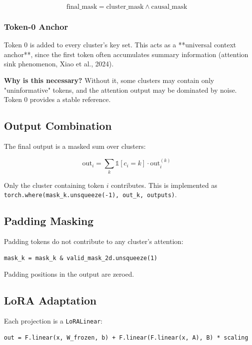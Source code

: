 \[
\text{final\_mask} = \text{cluster\_mask} \wedge \text{causal\_mask}
\tag{4.5}
\]

\subsubsection{Token-0 Anchor}

Token 0 is added to every cluster's key set. This acts as a **universal 
context anchor**, since the first token often accumulates summary 
information (attention sink phenomenon, Xiao et al., 2024).

\textbf{Why is this necessary?} Without it, some clusters may contain only 
"uninformative" tokens, and the attention output may be dominated by 
noise. Token 0 provides a stable reference.

\subsection{Output Combination}

The final output is a masked sum over clusters:

\[
\text{out}_i = \sum_k \mathbb{1}[c_i = k] \cdot \text{out}_i^{(k)}
\tag{4.6}
\]

Only the cluster containing token $i$ contributes. This is implemented as 
\texttt{torch.where(mask\_k.unsqueeze(-1), out\_k, outputs)}.

\subsection{Padding Masking}

Padding tokens do not contribute to any cluster's attention:

\begin{lstlisting}
mask_k = mask_k & valid_mask_2d.unsqueeze(1)
\end{lstlisting}

Padding positions in the output are zeroed.

\subsection{LoRA Adaptation}

Each projection is a \texttt{LoRALinear}:

\begin{lstlisting}
out = F.linear(x, W_frozen, b) + F.linear(F.linear(x, A), B) * scaling
\end{lstlisting}

